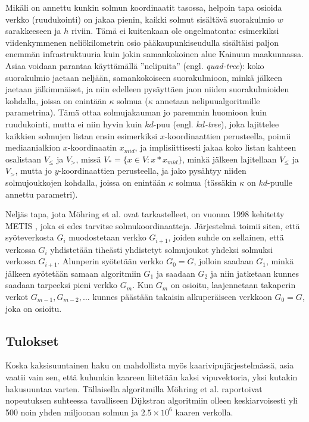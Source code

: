 \documentclass[finnish]{tktltiki2}
\theoremstyle{definition}
\theoremstyle{remark}
\begin{document}
 Mikäli on annettu kunkin solmun koordinaatit tasossa, helpoin tapa osioida verkko (ruudukointi) on jakaa pienin, kaikki solmut sisältävä suorakulmio $w$ sarakkeeseen ja $h$ riviin. Tämä ei kuitenkaan ole ongelmatonta: esimerkiksi viidenkymmenen neliökilometrin osio pääkaupunkiseudulla sisältäisi paljon enemmän infrastruktuuria kuin jokin samankokoinen alue Kainuun maakunnassa. Asiaa voidaan parantaa käyttämällä ''nelipuita'' (engl. \textit{quad-tree}): koko suorakulmio jaetaan neljään, samankokoiseen suorakulmioon, minkä jälkeen jaetaan jälkimmäiset, ja niin edelleen pysäyttäen jaon niiden suorakulmioiden kohdalla, joissa on enintään $\kappa$ solmua ($\kappa$ annetaan nelipuualgoritmille parametrina). Tämä ottaa solmujakauman jo paremmin huomioon kuin ruudukointi, mutta ei niin hyvin kuin $kd$-puu (engl. \textit{$kd$-tree}), joka lajittelee kaikkien solmujen listan ensin esimerkiksi $x$-koordinaattien perusteella, poimii mediaanialkion $x$-koordinaatin $x_{mid}$, ja implisiittisesti jakaa koko listan kahteen osalistaan $V_{\leq}$ ja $V_{>}$, missä $V_{\ast} = \{ x \in V \colon x \ast x_{mid}\}$, minkä jälkeen lajitellaan $V_{\leq}$ ja $V_{>}$, mutta jo $y$-koordinaattien perusteella, ja jako pysähtyy niiden solmujoukkojen kohdalla, joissa on enintään $\kappa$ solmua (tässäkin $\kappa$ on $kd$-puulle annettu parametri).
 
 Neljäs tapa, jota Möhring et al. ovat tarkastelleet, on vuonna 1998 kehitetty METIS \cite{Karypis98}, joka ei edes tarvitse solmukoordinaatteja. Järjestelmä toimii siten, että syöteverkosta $G_i$ muodostetaan verkko $G_{i + 1}$, joiden suhde on sellainen, että verkossa $G_i$ yhdistetään tiheästi yhdistetyt solmujoukot yhdeksi solmuksi verkossa $G_{i + 1}$. Alunperin syötetään verkko $G_0 = G$, jolloin saadaan $G_1$, minkä jälkeen syötetään samaan algoritmiin $G_1$ ja saadaan $G_2$ ja niin jatketaan kunnes saadaan tarpeeksi pieni verkko $G_m$. Kun $G_m$ on osioitu, laajennetaan takaperin verkot $G_{m - 1}, G_{m - 2}, \dots$ kunnes päästään takaisin alkuperäiseen verkkoon $G_0 = G$, joka on osioitu.
 
\subsection{Tulokset}
Koska kaksisuuntainen haku on mahdollista myös kaarivipujärjestelmässä, asia vaatii vain sen, että kuhunkin kaareen liitetään kaksi vipuvektoria, yksi kutakin hakusuuntaa varten. Tällaisella algoritmilla Möhring et al. raportoivat nopeutuksen suhteessa tavalliseen Dijkstran algoritmiin olleen keskiarvoisesti yli 500 noin yhden miljoonan solmun ja $2.5 \times 10^6$ kaaren verkolla.
 
\end{document}
